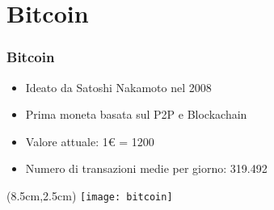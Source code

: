 \section{Bitcoin}
\begin{frame}
 \frametitle{Bitcoin}
 
 \begin{itemize}
  \item<1-> Ideato da Satoshi Nakamoto nel 2008
  \item<2-> Prima moneta basata sul P2P e Blockachain%
  \item<3-> Valore attuale: 1\euro{} =  1200\bitcoin{}
  \item<4-> Numero di transazioni medie per giorno: 319.492
 \end{itemize}

 
 
 \begin{textblock*}{5cm}(8.5cm,2.5cm)
  \texttt{[image: bitcoin]}
 \end{textblock*}
 
\end{frame}
